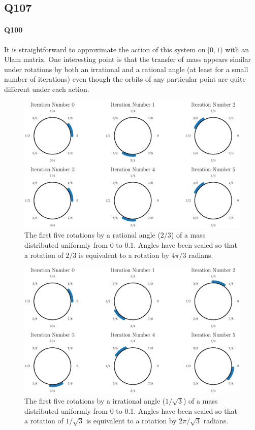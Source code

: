 \documentclass{article}
\begin{document}
\subsection*{Q107}
\paragraph{Q100}
It is straightforward to approximate the action of this system on $[0,1)$ with an Ulam matrix. One 
interesting point is that the transfer of mass appears similar under rotations by both an 
irrational and a rational angle (at least for a small number of iterations) even though the orbits 
of any particular point are quite different under each action.

\begin{figure}[H]
	\centering
	\includegraphics[scale = 0.6]{Q107_Ulam_Rot_23.eps}
	\caption{The first five rotations by a rational angle ($2/3$) of a mass distributed uniformly from 0 to 0.1. Angles 
	have been scaled so that a rotation of $2/3$ is equivalent to a rotation by $4\pi/3$ radians.}
\end{figure}

\begin{figure}[H]
	\centering
	\includegraphics[scale = 0.6]{Q107_Ulam_Rot_root3.eps}
	\caption{The first five rotations by a irrational angle ($1/\sqrt{3}$) of a mass distributed uniformly from 0 to 0.1. Angles 
	have been scaled so that a rotation of $1/\sqrt{3}$ is equivalent to a rotation by $2\pi/\sqrt{3}$ radians.}
\end{figure}
\end{document}
